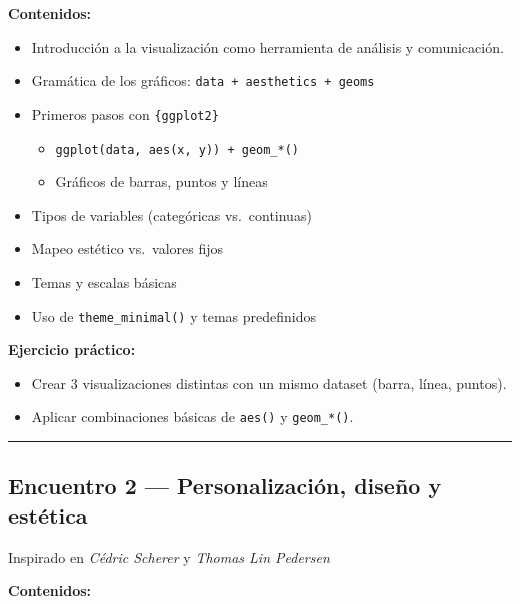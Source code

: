 \documentclass[
  11pt,
  letterpaper,
  DIV=11,
  numbers=noendperiod]{scrartcl}
\providecommand{\tightlist}{%
  \setlength{\itemsep}{0pt}\setlength{\parskip}{0pt}}\usepackage{longtable,booktabs,array}
\begin{document}
\textbf{Contenidos:}

\begin{itemize}
\tightlist
\item
  Introducción a la visualización como herramienta de análisis y
  comunicación.
\item
  Gramática de los gráficos: \texttt{data\ +\ aesthetics\ +\ geoms}
\item
  Primeros pasos con \texttt{\{ggplot2\}}

  \begin{itemize}
  \tightlist
  \item
    \texttt{ggplot(data,\ aes(x,\ y))\ +\ geom\_*()}
  \item
    Gráficos de barras, puntos y líneas
  \end{itemize}
\item
  Tipos de variables (categóricas vs.~continuas)
\item
  Mapeo estético vs.~valores fijos
\item
  Temas y escalas básicas
\item
  Uso de \texttt{theme\_minimal()} y temas predefinidos
\end{itemize}

\textbf{Ejercicio práctico:}

\begin{itemize}
\tightlist
\item
  Crear 3 visualizaciones distintas con un mismo dataset (barra, línea,
  puntos).
\item
  Aplicar combinaciones básicas de \texttt{aes()} y \texttt{geom\_*()}.
\end{itemize}

\begin{center}\rule{0.5\linewidth}{0.5pt}\end{center}

\subsection{Encuentro 2 --- Personalización, diseño y
estética}\label{encuentro-2-personalizaciuxf3n-diseuxf1o-y-estuxe9tica}

Inspirado en \emph{Cédric Scherer} y \emph{Thomas Lin Pedersen}

\textbf{Contenidos:}
\end{document}
